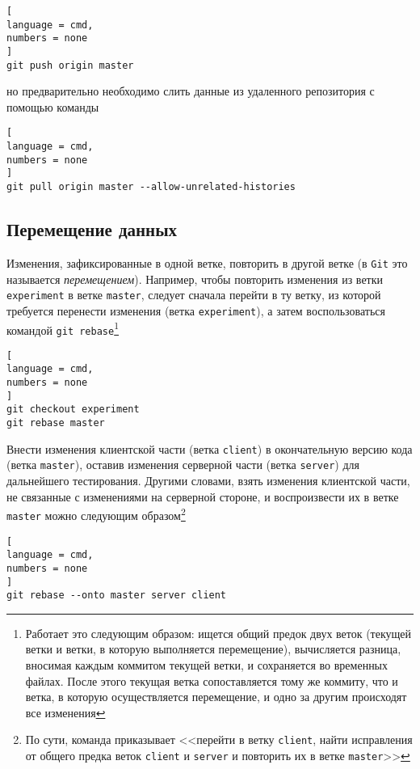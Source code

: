 \documentclass[%
	11pt,
	a4paper,
	utf8,
		]{article}
\begin{document}
\begin{lstlisting}[
language = cmd,
numbers = none
]
git push origin master
\end{lstlisting}

\noindent но предварительно необходимо слить данные из удаленного репозитория с помощью команды

\begin{lstlisting}[
language = cmd,
numbers = none
]
git pull origin master --allow-unrelated-histories
\end{lstlisting}


\subsection{Перемещение данных}

Изменения, зафиксированные в одной ветке, повторить в другой ветке (в \texttt{Git} это называется \emph{перемещением}). Например, чтобы повторить изменения из ветки \texttt{experiment} в ветке \texttt{master}, следует сначала перейти в ту ветку, из которой требуется перенести изменения (ветка \texttt{experiment}), а затем воспользоваться командой \texttt{git rebase}\footnote{Работает это следующим образом: ищется общий предок двух веток (текущей ветки и ветки, в которую выполняется перемещение), вычисляется разница, вносимая каждым коммитом текущей ветки, и сохраняется во временных файлах. После этого текущая ветка сопоставляется тому же коммиту, что и ветка, в которую осуществляется перемещение, и одно за другим происходят все изменения}

\begin{lstlisting}[
language = cmd,
numbers = none
]
git checkout experiment
git rebase master
\end{lstlisting}


Внести изменения клиентской части (ветка \texttt{client}) в окончательную версию кода (ветка \texttt{master}), оставив изменения серверной части (ветка \texttt{server}) для дальнейшего тестирования. Другими словами, взять изменения клиентской части, не связанные с изменениями на серверной стороне, и воспроизвести их в ветке \texttt{master} можно следующим образом\footnote{По сути, команда приказывает <<перейти в ветку \texttt{client}, найти исправления от общего предка веток \texttt{client} и \texttt{server} и повторить их в ветке \texttt{master}>>}

\begin{lstlisting}[
language = cmd,
numbers = none
]
git rebase --onto master server client
\end{lstlisting}
\end{document}
